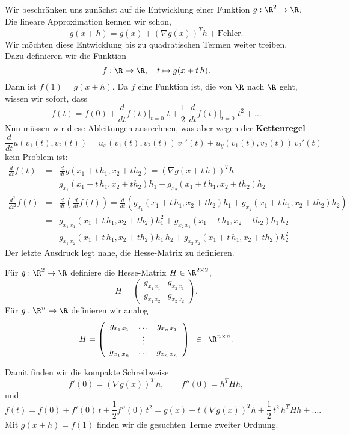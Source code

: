 Wir beschr\"anken uns zun\"achst auf die Entwicklung einer Funktion
$g:\R^2\rightarrow\R$. Die lineare Approximation kennen wir schon, 
$$g(x+h) = g(x)+(\nabla g(x))^T h +\mbox{Fehler}.$$
Wir m\"ochten diese Entwicklung bis zu quadratischen Termen 
weiter treiben. Dazu definieren wir die Funktion
$$ f:\R\rightarrow\R,\quad t\mapsto g(x+t\, h).$$
Dann ist $f(1)=g(x+h)$. Da $f$ eine Funktion ist, die von $\R$ nach
$\R$ geht, wissen wir sofort, dass
$$f(t) = f(0)
+\frac d{dt} f(t)\bigg|_{t=0}\,\, t
+\frac 1 2 \,\,\frac d{dt} f(t)\bigg|_{t=0}\,\, t^2+\ldots
$$
Nun m\"ussen wir diese Ableitungen ausrechnen, was aber wegen der 
{\bf Kettenregel}
$$ \frac d {dt} u(v_1(t), v_2(t)) = u_x(v_1(t), v_2(t))\, v_1'(t)
                 +u_y(v_1(t), v_2(t))\,v_2'(t)$$
 kein Problem ist:
\begin{eqnarray*}
\frac d {dt} f(t) &=& \frac d{dt} g(x_1+t\, h_1,x_2+th_2) 
= (\nabla g(x+t\,h))^Th\\
&=& 
g_{x_1}(x_1+t\, h_1,x_2+th_2) h_1 
+
g_{x_2}(x_1+t\, h_1,x_2+th_2) h_2\\
\frac {d^2} {dt^2} f(t) &=& \frac d{dt} \left(\frac d {dt} f(t)\right)
= 
 \frac d{dt} \left(
 g_{x_1}(x_1+t\, h_1,x_2+th_2) h_1 
+
g_{x_2}(x_1+t\, h_1,x_2+th_2) h_2
 \right)\\
 &=&  
 g_{x_1\,x_1}(x_1+t\, h_1,x_2+th_2) h_1^2 
 + 
 g_{x_2\,x_1}(x_1+t\, h_1,x_2+th_2) h_1\, h_2\\
 && 
 g_{x_1\,x_2}(x_1+t\, h_1,x_2+th_2) h_1\, h_2
 + 
 g_{x_2\,x_2}(x_1+t\, h_1,x_2+th_2) h_2^2
\end{eqnarray*}
Der letzte Ausdruck legt nahe, die Hesse-Matrix zu definieren.
\begin{defi}
F\"ur $g:\R^2\rightarrow\R$ definiere die Hesse-Matrix $H\in\R^{2\times 2}$,
$$H = \left(\begin{array}{cc}
g_{x_1\,x_1} & g_{x_2\,x_1}\\
g_{x_1\,x_2} & g_{x_2\,x_2}
\end{array}\right).
$$
F\"ur $g:\R^n\rightarrow \R$ definieren wir analog
$$H = \left(\begin{array}{ccc}
g_{x_1\,x_1} & \ldots &g_{x_n\,x_1}\\
 & \vdots & \\
g_{x_1\,x_n} & \ldots & g_{x_n\,x_n}
\end{array}\right)\,\,\,\in\,\,\,\R^{n\times n}.
$$
\end{defi}
Damit finden wir die kompakte Schreibweise
$$ f'(0) = (\nabla g(x))^T\,h,\qquad f''(0) = h^THh,$$
und 
$$ f(t) = f(0)+ f'(0)\, t+\frac 1 2 f''(0)\, t^2
= g(x)+t\,(\nabla g(x))^T h+\frac 1 2\,t^2\, h^T H h+\ldots.$$
Mit $g(x+h)=f(1)$ finden wir die gesuchten Terme zweiter Ordnung.


